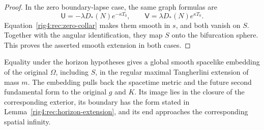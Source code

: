 \begin{proof}
In the zero boundary-lapse case, the same graph formulas are
\[
 \mathsf U=-\lambda D_*(N)e^{-\kappa T_0},\qquad
 \mathsf V=\lambda D_*(N)e^{\kappa T_0}.
\]
Equation~\eqref{rig4:rec:zero-collar} makes them smooth in $s$, and both vanish on
$S$.  Together with the angular identification, they map $S$ onto the
bifurcation sphere.  This proves the asserted smooth extension in both cases.
\end{proof}

\begin{proposition}
\label{rig4:rec:embedding}
Equality under the horizon hypotheses gives a global smooth spacelike
embedding of the original $\Omega$, including $S$, in the regular maximal
Tangherlini extension of mass $m$.  The embedding pulls back the spacetime
metric and the future second fundamental form to the original $g$ and $K$.
Its image lies in the closure of the corresponding exterior, its boundary
has the form stated in Lemma~\ref{rig4:rec:horizon-extension}, and its end
approaches the corresponding spatial infinity.
\end{proposition}


